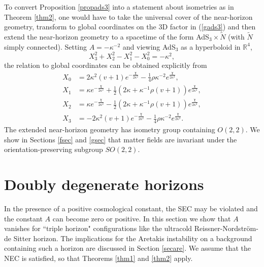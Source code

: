 \documentclass[11pt, reqno]{amsart}
\newcommand{\R}{\mathbb{R}}
\theoremstyle{plain}
\theoremstyle{definition}
\numberwithin{equation}{section}
\begin{document}
To convert Proposition \ref{propads3} into a statement about isometries as in Theorem \ref{thm2}, one would have to take the universal cover of the near-horizon geometry, transform to global coordinates on the 3D factor in (\ref{gads3}) and then extend the near-horizon geometry to a spacetime of the form AdS$_3 \times \tilde{N}$ (with $\tilde{N}$ simply connected). Setting $A = -\kappa^{-2}$ and viewing AdS$_3$ as a hyperboloid in $\R^4$,
\begin{equation*}
    X_3^2 + X_2^2 - X_1^2 - X_0^2 = -\kappa^2,
\end{equation*}
the relation to global coordinates can be obtained explicitly from
\begin{equation} \label{ads3c}
\begin{aligned}
    X_0 &= 2\kappa^2(v+1)e^{-\frac{\chi}{2\kappa^2}} -\tfrac 14\rho\kappa^{-2}e^{\frac{\chi}{2\kappa^2}}, \\
    X_1 &= \kappa e^{-\frac{\chi}{2\kappa^2}} + \tfrac 12(2\kappa + \kappa^{-1}\rho(v+1))e^{\frac{\chi}{2\kappa^2}}, \\
    X_2 &= \kappa e^{-\frac{\chi}{2\kappa^2}} -  \tfrac 12(2\kappa + \kappa^{-1}\rho(v+1))e^{\frac{\chi}{2\kappa^2}}, \\
    X_3 &=  -2\kappa^2(v+1)e^{-\frac{\chi}{2\kappa^2}} -\tfrac 14\rho\kappa^{-2}e^{\frac{\chi}{2\kappa^2}}. 
\end{aligned}
\end{equation}
The extended near-horizon geometry has isometry group containing $O(2,2)$. We show in Sections \ref{fsec} and \ref{gsec} that matter fields are invariant under the orientation-preserving subgroup  $SO(2,2)$.

\section{Doubly degenerate horizons}  \label{ddhbigsec}
In the presence of a positive cosmological constant, the SEC may be violated and the constant $A$ can become zero or positive. In this section we show that $A$ vanishes for ``triple horizon" configurations like the ultracold Reissner-Nordström-de Sitter horizon. The implications for the Aretakis instability on a background containing such a horizon are discussed in Section \ref{secare}. We assume that the NEC is satisfied, so that Theorems \ref{thm1} and \ref{thm2} apply.
\end{document}
